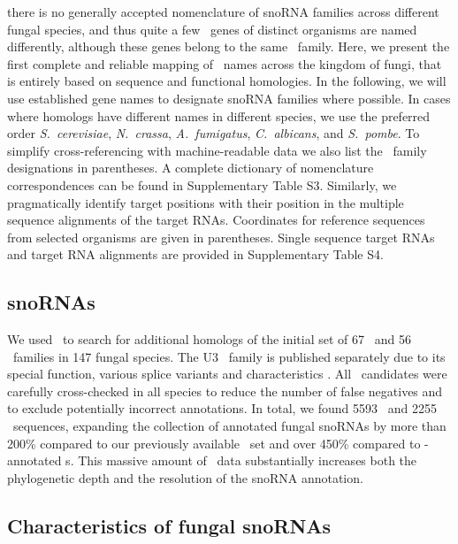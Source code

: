  there is no generally accepted nomenclature of snoRNA
families across different fungal species, and thus quite a few \sno\ genes
of distinct organisms are named differently, although these genes belong to
the same \sno\ family. Here, we present the first complete and reliable
mapping of \sno\ names across the kingdom of fungi, that is entirely based
on sequence and functional homologies.  In the following, we will use
established gene names to designate snoRNA families where possible. In
cases where homologs have different names in different species, we use the
preferred order \emph{S.\ cerevisiae}, \emph{N.\ crassa}, \emph{A.\
  fumigatus}, \emph{C.\ albicans}, and \emph{S.\ pombe}. To simplify
cross-referencing with machine-readable data we also list the \snostrip\
family designations in parentheses.  A complete dictionary of nomenclature
correspondences can be found in Supplementary Table S3.  Similarly, we
pragmatically identify target positions with their position in the multiple
sequence alignments of the target RNAs. Coordinates for reference sequences
from selected organisms are given in parentheses.  Single sequence target
RNAs and target RNA alignments are provided in Supplementary Table S4.

\subsection{\PFS{Expanded complement of fungal} snoRNAs}

We used \snostrip\ to search for additional homologs of the initial set of
67 \cd\ and 56 \haca\ families in 147 fungal species. The U3 \sno\ family
is published separately due to its special function, various splice
variants and characteristics \cite{Canzler:2017}. All \snostrip\ candidates
were carefully cross-checked in all species to reduce the number of false
negatives and to exclude potentially incorrect annotations.  In total, we
found 5593 \cd\ and 2255 \haca\ sequences, expanding the collection of
annotated fungal snoRNAs by more than 200\% compared to our previously
available \sno\ set \cite{Bartschat:2014} and over 450\% compared to
\rfam{}-annotated \sno s. This massive amount of \sno\ data substantially
increases both the phylogenetic depth and the resolution of the snoRNA
annotation.

\subsection{Characteristics of fungal snoRNAs}

